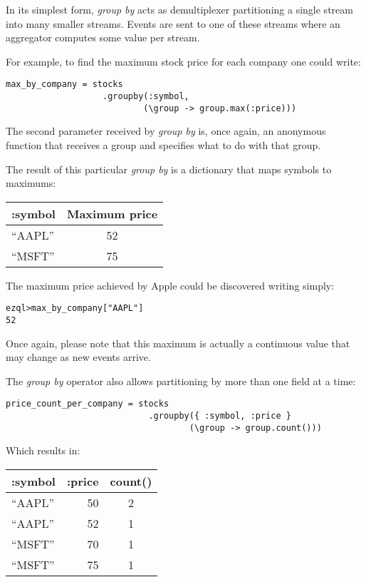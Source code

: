 \documentclass{report}
\newenvironment{evaluation}
{
  \framed
  \begin{alltt}
}
{
  \end{alltt}
  \endframed
}
\begin{document}
In its simplest form, \emph{group by} acts as demultiplexer
partitioning a single stream into many smaller streams. Events are
sent to one of these streams where an aggregator computes some value
per stream.

For example, to find the maximum stock price for each company one
could write:

\begin{verbatim}
max_by_company = stocks
                   .groupby(:symbol,
                           (\group -> group.max(:price)))
\end{verbatim}

The second parameter received by \emph{group by} is, once again, an
anonymous function that receives a group and specifies what to do with
that group.

The result of this particular \emph{group by} is a dictionary that
maps symbols to maximums:

\begin{tabular}{ |l|c| }
  \hline
  :symbol & Maximum price \\
  \hline
  ``AAPL'' & 52 \\
  ``MSFT'' & 75 \\
  \hline
\end{tabular}

The maximum price achieved by Apple could be discovered writing
simply:

\begin{evaluation}
ezql> max_by_company["AAPL"]
52
\end{evaluation}

Once again, please note that this maximum is actually a continuous
value that may change as new events arrive.

The \emph{group by} operator also allows partitioning by more than one
field at a time:

\begin{verbatim}
price_count_per_company = stocks
                            .groupby({ :symbol, :price }
                                    (\group -> group.count()))
\end{verbatim}

Which results in:

\begin{tabular}{ |l|r|c| }
  \hline
  :symbol & :price & count() \\
  \hline
  ``AAPL'' & 50 & 2 \\
  ``AAPL'' & 52 & 1 \\
  ``MSFT'' & 70 & 1 \\
  ``MSFT'' & 75 & 1 \\
  \hline
\end{tabular}
\end{document}
